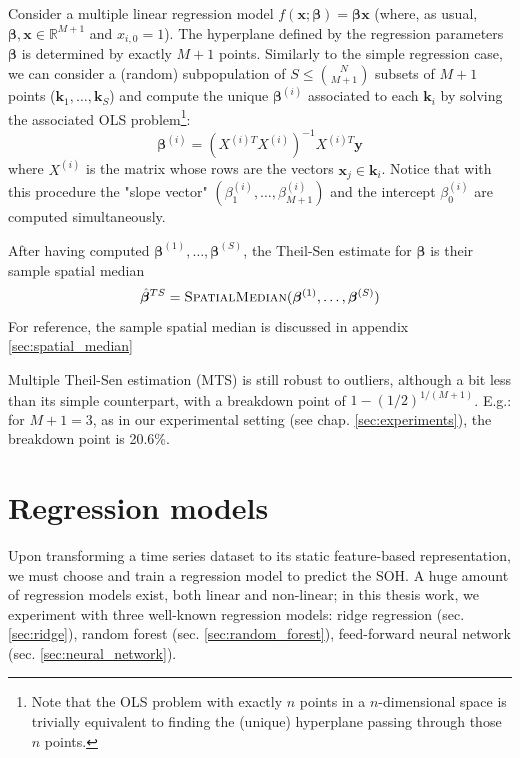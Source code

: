 Consider a multiple linear regression model $f(\mathbf{x};\bm{\beta}) = \bm{\beta}\mathbf{x}$ (where, as usual, $\bm{\beta},\mathbf{x} \in \mathbb{R}^{M+1}$ and $x_{i,0}=1$). The hyperplane defined by the regression parameters $\bm{\beta}$ is determined by exactly $M+1$ points. Similarly to the simple regression case, we can consider a (random) subpopulation of $S\leq \binom{N}{M+1}$ subsets of $M+1$ points ($\mathbf{k}_1, \dots, \mathbf{k}_S$) and compute the unique $\bm{\beta}^{(i)}$ associated to each $\mathbf{k}_i$ by solving the associated OLS problem\footnote{Note that the OLS problem with exactly $n$ points in a $n$-dimensional space is trivially equivalent to finding the (unique) hyperplane passing through those $n$ points.}:
\begin{equation}
\bm{\beta}^{(i)} = (X^{(i)T} X^{(i)})^{-1} X^{(i)T} \mathbf{y}
\end{equation}
where $X^{(i)}$ is the matrix whose rows are the vectors $\mathbf{x}_{j} \in \mathbf{k}_i$. Notice that with this procedure the "slope vector" $(\beta_1^{(i)},\dots,\beta_{M+1}^{(i)})$ and the intercept $\beta_0^{(i)}$ are computed simultaneously.

After having computed $\bm{\beta}^{(1)},\dots,\bm{\beta}^{(S)}$, the Theil-Sen estimate for $\bm{\beta}$ is their sample spatial median \cite{spatial_median}
\begin{equation}
\hat{\bm{\beta}}^{TS} = \text{\textsc{SpatialMedian}}(\bm{\beta}^{(1)},\dots,\bm{\beta}^{(S)})
\end{equation}
For reference, the sample spatial median is discussed in appendix \ref{sec:spatial_median}

Multiple Theil-Sen estimation (MTS) is still robust to outliers, although a bit less than its simple counterpart, with a breakdown point of $1-(1/2)^{1/(M+1)}$. E.g.: for $M+1=3$, as in our experimental setting (see chap. \ref{sec:experiments}), the breakdown point is 20.6\%.





\section{Regression models}
\label{sec:regr_models}
Upon transforming a time series dataset to its static feature-based representation, we must choose and train a regression model to predict the SOH. A huge amount of regression models exist, both linear and non-linear; in this thesis work, we experiment with three well-known regression models: ridge regression (sec. \ref{sec:ridge}), random forest (sec. \ref{sec:random_forest}), feed-forward neural network (sec. \ref{sec:neural_network}).



